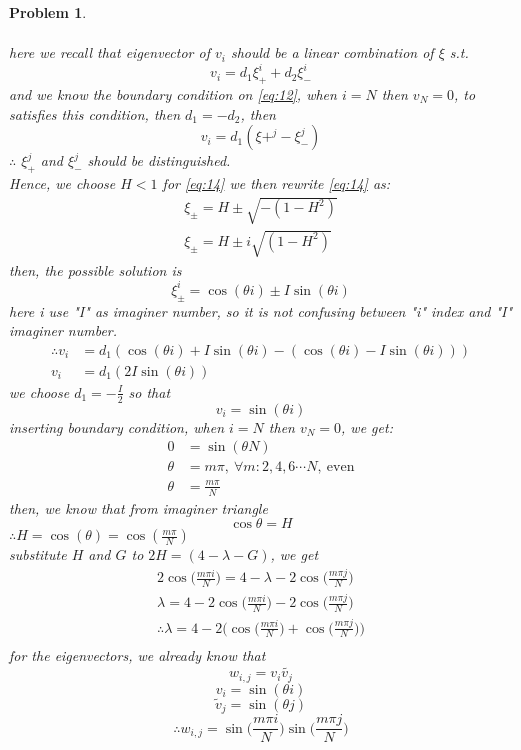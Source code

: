 \documentclass[a4paper,12pt]{article}
\newtheorem{prob}{Problem}[]
\begin{document}
\begin{prob}
\begin{enumerate}[label=(\alph*)]
\begin{equation}
\begin{aligned}
		\end{aligned}
		\end{equation}
		here we recall that eigenvector of $v_i$ should be a linear combination of $\xi$ s.t. $$v_i = d_1\xi_+^i + d_2\xi_-^i$$
		and we know the boundary condition on \eqref{eq:12}, when $i=N$ then $v_N=0$, to satisfies this condition, then $d_1 = -d_2$, then $$v_i = d_1(\xi+^j - \xi_-^j)$$ $\therefore$ $\xi_+^j$ and $\xi_-^j$ should be distinguished.\\
		Hence, we choose $H<1$ for \eqref{eq:14} we then rewrite \eqref{eq:14} as:
		\begin{equation*}
		\begin{aligned}
		\xi_\pm = H \pm \sqrt{-(1-H^2)}\\
		\xi_\pm = H \pm i\sqrt{(1-H^2)}
		\end{aligned}
		\end{equation*}
		then, the possible solution is $$\xi_\pm^i = \cos(\theta i) \pm I \sin(\theta i)$$
		here i use "I" as imaginer number, so it is not confusing between "i" index and "I" imaginer number.
		\begin{equation*}
		\begin{aligned}
		\therefore v_i &= d_1(\cos(\theta i) + I \sin(\theta i) - (\cos(\theta i) - I \sin(\theta i)))\\
		v_i &= d_1(2 I \sin(\theta i))
		\end{aligned}
		\end{equation*}
		we choose $d_1 = -\frac{I}{2}$ so that $$v_i = \sin(\theta i)$$
		inserting boundary condition, when $i=N$ then $v_N=0$, we get:
		\begin{equation*}
		\begin{aligned}
		0 &= \sin(\theta N)\\
		\theta &= m\pi,\ \forall m:2,4,6\cdots N,\ \text{even}\\
		\theta &= \frac{m\pi}{N}
		\end{aligned}
		\end{equation*}
		then, we know that from imaginer triangle $$\cos \theta = H$$
		$\therefore H = \cos(\theta) = \cos(\frac{m\pi}{N})$\\
		substitute $H$ and $G$ to $2H=(4-\lambda-G)$, we get
		\begin{equation*}
		\begin{aligned}
		2 \cos\bigg(\frac{m\pi i}{N}\bigg) = 4-\lambda -2 \cos\bigg(\frac{m\pi j}{N}\bigg)\\
		\lambda = 4 -2 \cos\bigg(\frac{m\pi i}{N}\bigg) -2 \cos\bigg(\frac{m\pi j}{N}\bigg)\\
		\therefore \lambda = 4 -2 \bigg(\cos\bigg(\frac{m\pi i}{N}\bigg) + \cos\bigg(\frac{m\pi j}{N}\bigg) \bigg)\\
		\end{aligned}
		\end{equation*}
		for the eigenvectors, we already know that 
		$$w_{i,j} = v_i \tilde{v_j}$$
		$$v_i = \sin(\theta i)$$
		$$\tilde{v}_j = \sin(\theta j)$$
		$$\therefore w_{i,j} = \sin\bigg(\frac{m\pi i}{N}\bigg) \sin\bigg(\frac{m\pi j}{N}\bigg)$$
		

\end{enumerate}
\end{prob}
\end{document}
